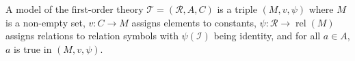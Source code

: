 A model of the first-order theory $\mathcal{T} = (\mathcal{R}, A, C)$ is a triple $(M, v, \psi)$ where $M$ is a non-empty set, $v: C \to M$ assigns elements to constants, $\psi: \mathcal{R} \to \operatorname{rel}(M)$ assigns relations to relation symbols with $\psi(\mathcal{I})$ being identity, and for all $a \in A$, $a$ is true in $(M, v, \psi)$.
